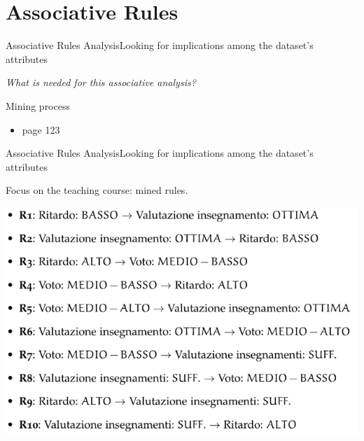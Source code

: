 \section{Associative Rules}

\begin{frame}{Associative Rules Analysis}{Looking for implications among the dataset's attributes}

 \centering\textit{What is needed for this associative analysis?} \vspace{0,3cm}

	\begin{block}{Mining process}
		\begin{itemize}
			\item<1-> page 123
		\end{itemize}
	\end{block}

\end{frame}

\begin{frame}{Associative Rules Analysis}{Looking for implications among the dataset's attributes}

    Focus on the \alert{teaching course}: mined rules.

    \vspace{0.5cm}
    \begin{centering}
        \hspace{0.5cm}\includegraphics[scale=0.36]{ass2.png}
    \end{centering}

\end{frame}


